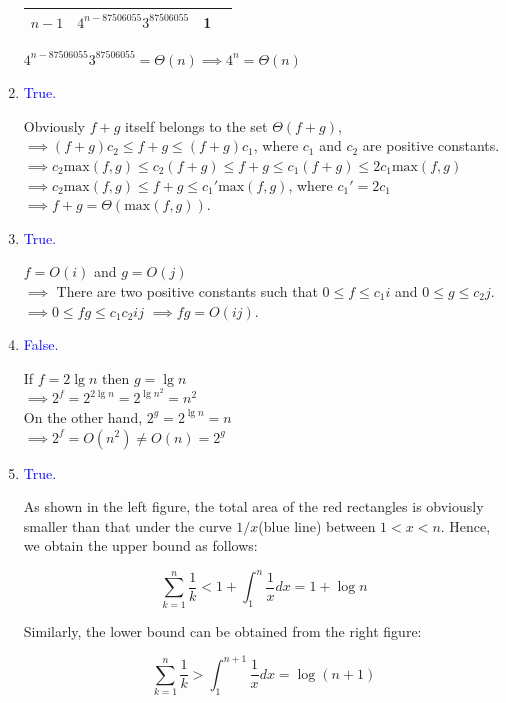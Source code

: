 \documentclass[12pt]{article}
\begin{document}
\begin{enumerate}
\begin{tabular}{@{}cccc@{}}
     $n-1$     & $4^{n-87506055}3^{87506055}$  & 1                \\ \bottomrule
    \end{tabular}\par
    $4^{n-87506055}3^{87506055}=\Theta(n) \implies 4^{n}=\Theta(n)$
 \item \textcolor{blue}{True.} \par
    Obviously $f+g$ itself belongs to the set $\Theta(f+g)$,\\
      $\implies (f+g)c_{2}\leq f+g \leq (f+g)c_{1}$, where $c_{1}$ and $c_{2}$ are positive constants.\\
      $\implies c_{2}\text{max}(f,g)\leq c_{2}(f+g)\leq f+g \leq c_{1}(f+g)\leq 2c_{1}\text{max}(f,g)$\\
      $\implies c_{2}\text{max}(f,g)\leq f+g \leq c_{1}'\text{max}(f,g)$, where $c_{1}'=2c_{1}$\\
      $\implies f+g=\Theta(\text{max}(f,g)).$
 \item \textcolor{blue}{True.} \par
    $f=O(i)$ and $g=O(j)$\\
    $\implies$ There are two positive constants such that $0 \leq f \leq c_{1}i$ and $0 \leq g \leq c_{2}j$.\\
    $\implies 0 \leq fg \leq c_{1}c_{2}ij$
    $\implies fg=O(ij)$.
 \item \textcolor{blue}{False.} \par
    If $f=2\lg n$ then $g=\lg n$\\
    $\implies 2^{f}=2^{2\lg n}=2^{\lg n^{2}}=n^2$\\
    On the other hand, $2^{g}=2^{\lg n}=n$\\
    $\implies 2^{f}=O(n^2)\neq O(n) = 2^{g}$
 \item \textcolor{blue}{True.} \par
    As shown in the left figure, the total area of the red rectangles is obviously smaller than
    that under the curve $1/x$(blue line) between $1<x<n$. Hence, we obtain the upper bound as follows:

    \begin{equation}
       \sum_{k=1}^{n}\dfrac{1}{k}<1+\int_{1}^{n} \dfrac{1}{x}dx=1+\log n
       \label{upper}
    \end{equation}

    Similarly, the lower bound can be obtained from the right figure:

    \begin{equation}
       \sum_{k=1}^{n}\dfrac{1}{k}>\int_{1}^{n+1} \dfrac{1}{x}dx=\log (n+1)
       \label{lower}
    \end{equation}


\end{enumerate}
\end{document}
